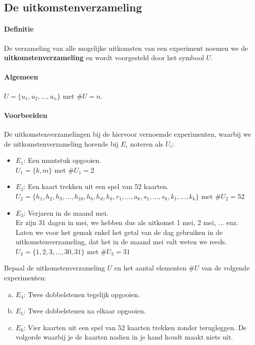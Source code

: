 \documentclass[12pt,twoside]{article}
\begin{document}
\subsection{De uitkomstenverzameling}

\paragraph*{Definitie}
De verzameling van alle mogelijke uitkomsten van een experiment noemen we de
{\bf uitkomstenverzameling} en wordt voorgesteld door het symbool $U$.

\paragraph*{Algemeen}
$U=\{u_1, u_2, \ldots, u_n\}$ met $\#U=n$.

\paragraph*{Voorbeelden} De uitkomstenverzamelingen bij de hiervoor vernoemde experimenten, waarbij we de uitkomstenverzameling horende bij $E_i$ noteren als $U_i$:
\begin{itemize}
  \item $E_1$: Een muntstuk opgooien.\\
  $U_1 = \{k,m\}$ met $\#U_1=2$
  \item $E_2$: Een kaart trekken uit een spel van 52 kaarten.\\
  $U_2 = \{h_1, h_2, h_3, \ldots , h_{10}, h_b, h_d, h_k, r_1, \ldots, a_k, s_1, \ldots, s_k, k_1, \ldots, k_k \}$ met $\#U_2=52$
  \item $E_3$: Verjaren in de maand mei.\\
  Er zijn 31 dagen in mei, we hebben dus als uitkomst 1 mei, 2 mei, ... enz. Laten we voor het gemak enkel het getal van de dag gebruiken in de uitkomstenverzameling, dat het in de maand mei valt weten we reeds.\\
  $U_3 = \{1, 2, 3, \ldots, 30, 31\}$ met $\#U_3=31$
\end{itemize}

\begin{oefening}
Bepaal de uitkomstenverzameling $U$ en het aantal elementen $\#U$ van de volgende experimenten:
\begin{enumerate}[(a)]
  \item $E_4$: Twee dobbelstenen tegelijk opgooien.
  \item $E_5$: Twee dobbelstenen na elkaar opgooien.
  \item $E_6$: Vier kaarten uit een spel van 52 kaarten trekken zonder terugleggen. De volgorde waarbij je de kaarten nadien in je hand houdt maakt niets uit.
\end{enumerate}
\end{oefening}
\end{document}
